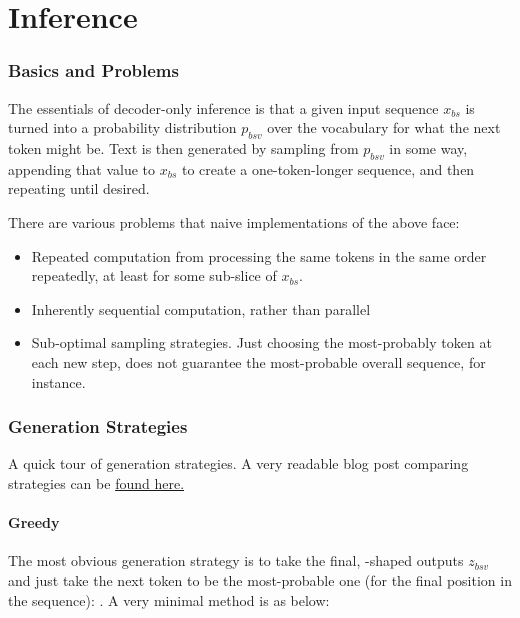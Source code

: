 \part{Inference}


\section{Basics and Problems}


The essentials of decoder-only inference is that a given input sequence $ x _{ bs } $ is turned into
a probability distribution $ p _{ bsv } $ over the vocabulary for what the next token might be.  Text
is then generated by sampling from $ p _{ bsv } $ in some way, appending that value to $ x _{ bs } $
to create a one-token-longer sequence, and then repeating until desired.

There are various problems that naive implementations of the above face:
\begin{itemize}
	\item Repeated computation from processing the same tokens in the same order repeatedly, at least for
	      some sub-slice of $ x _{ bs } $.
	\item Inherently sequential computation, rather than parallel
	\item Sub-optimal sampling strategies. Just choosing the most-probably token at each new step, does
	      not guarantee the most-probable overall sequence, for instance.
\end{itemize}



\section{Generation Strategies \label{sec_generation_strats} }

A quick tour of generation strategies. A very readable blog post comparing strategies can be
\href{https://huggingface.co/blog/how-to-generate}{found here.}


\subsection{Greedy \label{subsec_greedy_gen}}

The most obvious generation strategy is to take the final, -shaped outputs $ z
		_{ bsv } $ and just take the next token to be the most-probable one (for the final position in the
sequence): . A very minimal  method
is as below:

